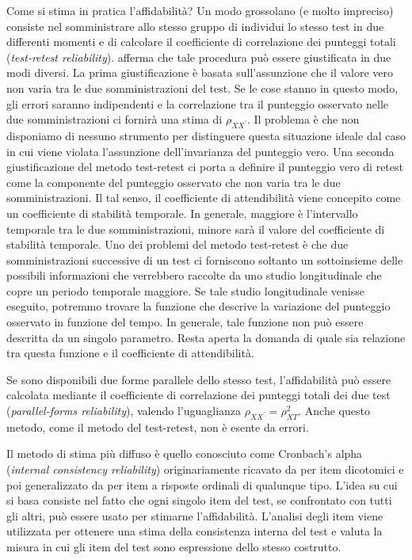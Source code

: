 \documentclass[
  11pt,
]{krantz}
\theoremstyle{definition}
\theoremstyle{definition}
\theoremstyle{definition}
\theoremstyle{definition}
\theoremstyle{remark}
\begin{document}
Come si stima in pratica l'affidabilità? Un modo grossolano (e molto impreciso) consiste nel somministrare allo stesso gruppo di individui lo stesso test in due differenti momenti e di calcolare il coefficiente di correlazione dei punteggi totali (\emph{test-retest reliability}). \citet{mcdonald2013test} afferma che tale procedura può essere giustificata in due modi diversi. La prima giustificazione è basata sull'assunzione che il valore vero non varia tra le due somministrazioni del test. Se le cose stanno in questo modo, gli errori saranno indipendenti e la correlazione tra il punteggio osservato nelle due somministrazioni ci fornirà una stima di \(\rho_{XX^\prime}\). Il problema è che non disponiamo di nessuno strumento per distinguere questa situazione ideale dal caso in cui viene violata l'assunzione dell'invarianza del punteggio vero. Una seconda giustificazione del metodo test-retest ci porta a definire il punteggio vero di retest come la componente del punteggio osservato che non varia tra le due somministrazioni. Il tal senso, il coefficiente di attendibilità viene concepito come un coefficiente di stabilità temporale. In generale, maggiore è l'intervallo temporale tra le due somministrazioni, minore sarà il valore del coefficiente di stabilità temporale. Uno dei problemi del metodo test-retest è che due somministrazioni successive di un test ci forniscono soltanto un sottoinsieme delle possibili informazioni che verrebbero raccolte da uno studio longitudinale che copre un periodo temporale maggiore. Se tale studio longitudinale venisse eseguito, potremmo trovare la funzione che descrive la variazione del punteggio osservato in funzione del tempo. In generale, tale funzione non può essere descritta da un singolo parametro. Resta aperta la domanda di quale sia relazione tra questa funzione e il coefficiente di attendibilità.

Se sono disponibili due forme parallele dello stesso test, l'affidabilità può essere calcolata mediante il coefficiente di correlazione dei punteggi totali dei due test (\emph{parallel-forms reliability}), valendo l'uguaglianza \(\rho_{XX^\prime} = \rho^2_{XT}\). Anche questo metodo, come il metodo del test-retest, non è esente da errori.

Il metodo di stima più diffuso è quello conosciuto come Cronbach's alpha (\emph{internal consistency reliability}) originariamente ricavato da \citet{kuder1937theory} per item dicotomici e poi generalizzato da \citet{cronbach1951coefficient} per item a risposte ordinali di qualunque tipo. L'idea su cui si basa consiste nel fatto che ogni singolo item del test, se confrontato con tutti gli altri, può essere usato per stimarne l'affidabilità. L'analisi degli item viene utilizzata per ottenere una stima della consistenza interna del test e valuta la misura in cui gli item del test sono espressione dello stesso costrutto.
\end{document}
